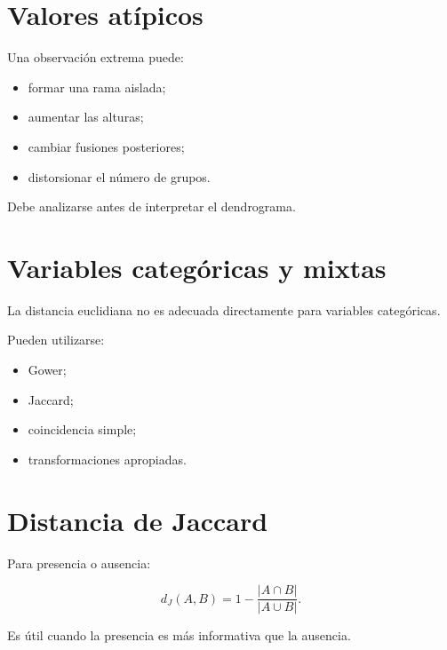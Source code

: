 \documentclass[
  spanish,
  10.5pt,
  letterpaper,
  DIV=11,
  numbers=noendperiod,
  oneside,
  open=any]{scrreprt}
\providecommand{\tightlist}{%
  \setlength{\itemsep}{0pt}\setlength{\parskip}{0pt}}
\theoremstyle{definition}
\theoremstyle{definition}
\theoremstyle{plain}
\theoremstyle{remark}
\begin{document}
\section*{Valores atípicos}\label{valores-atuxedpicos-1}


Una observación extrema puede:

\begin{itemize}
\tightlist
\item
  formar una rama aislada;
\item
  aumentar las alturas;
\item
  cambiar fusiones posteriores;
\item
  distorsionar el número de grupos.
\end{itemize}

Debe analizarse antes de interpretar el dendrograma.

\section*{Variables categóricas y
mixtas}\label{variables-categuxf3ricas-y-mixtas}


La distancia euclidiana no es adecuada directamente para variables
categóricas.

Pueden utilizarse:

\begin{itemize}
\tightlist
\item
  Gower;
\item
  Jaccard;
\item
  coincidencia simple;
\item
  transformaciones apropiadas.
\end{itemize}

\section*{Distancia de Jaccard}\label{distancia-de-jaccard}


Para presencia o ausencia:

\[
d_J(A,B)
=
1-
\frac{|A\cap B|}{|A\cup B|}.
\]

Es útil cuando la presencia es más informativa que la ausencia.
\end{document}
